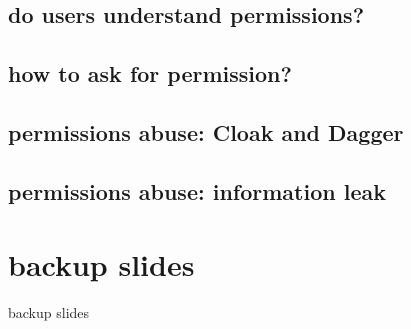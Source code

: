\subsection{do users understand permissions?}


\subsection{how to ask for permission?}


\subsection{permissions abuse: Cloak and Dagger}


\subsection{permissions abuse: information leak}






\section{backup slides}
\begin{frame}{backup slides}
\end{frame}

%

